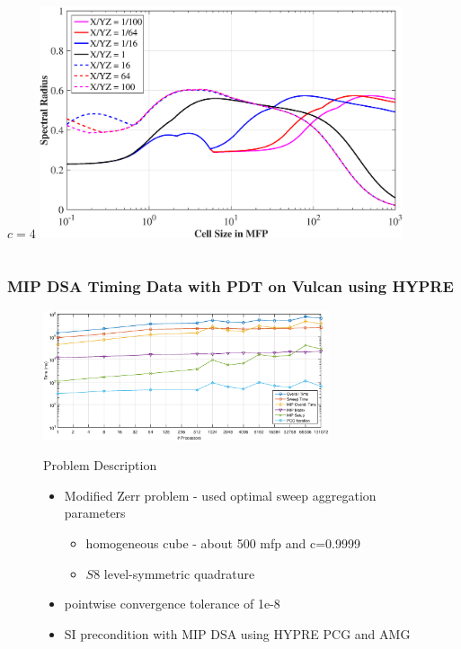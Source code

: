 \documentclass[compress,10pt]{beamer}
\begin{document}
\begin{frame}[t]
\begin{columns}
\begin{block}{$c=4$}
{}\includegraphics[width=0.8\textwidth]{images/SI_MIP_hex_LS8_C=4_AR.eps}
\end{block}
\end{columns}
\end{frame}
\begin{frame}[t]\frametitle{MIP DSA Timing Data with PDT on Vulcan using HYPRE}
\begin{figure}[t]
\centering
{}\includegraphics[width=0.75\textwidth]{images/Vulcan_DSA_Timing.eps}
\begin{block}{Problem Description}
	\begin{itemize}
	\item Modified Zerr problem - used optimal sweep aggregation parameters
	\begin{itemize}
	\item homogeneous cube - about 500 mfp and c=0.9999
	\item $S8$ level-symmetric quadrature
	\end{itemize}
	\item pointwise convergence tolerance of 1e-8
	\item SI precondition with MIP DSA using HYPRE PCG and AMG
	\end{itemize}
\end{block}
\end{figure}
\end{frame}
\end{document}
